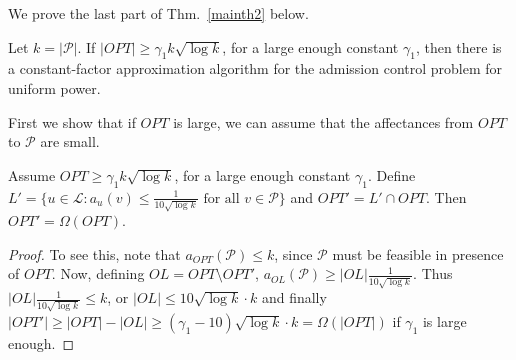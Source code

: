 \documentclass[11pt]{amsart}
\def\calL{{\mathcal L}}
\def\calP{{\mathcal P}}
\begin{document}
We prove the last part of Thm.~\ref{mainth2} below.
\begin{theorem}
Let $k = |\calP|$.
If $|OPT| \geq  \gamma_1 k \sqrt{\log k}$, for a large enough constant $\gamma_1$, then there is a constant-factor approximation algorithm for the admission control problem for uniform power.
\end{theorem}

First we show that if $OPT$ is large, we can assume that the affectances from $OPT$ to $\calP$ are small.

\begin{lemma}
Assume $OPT \geq  \gamma_1 k \sqrt{\log k}$, for a large enough constant $\gamma_1$. 
Define $L' = \{u \in \calL: a_u(v) \leq \frac{1}{10 \sqrt{\log k}} \text { for all } v \in \calP\}$ and $OPT' = L' \cap OPT$.
Then $OPT' = \Omega(OPT)$.
\label{lem:saffect}
\end{lemma}
\begin{proof}
To see this, note that $a_{OPT}(\calP) \leq k$, since $\calP$ must be feasible in presence of $OPT$. Now, defining $OL = OPT \setminus OPT'$, $a_{OL}(\calP) \geq |OL| \frac{1}{10 \sqrt{\log k}}$.
Thus $|OL| \frac{1}{10 \sqrt{\log k}} \leq k$, or $|OL| \leq 10 \sqrt{\log k} \cdot k$ and finally $|OPT'| \geq |OPT| - |OL| \geq (\gamma_1 - 10) \sqrt{\log k} \cdot k = \Omega(|OPT|)$ if $\gamma_1$ is large enough.
\end{proof}
\end{document}
